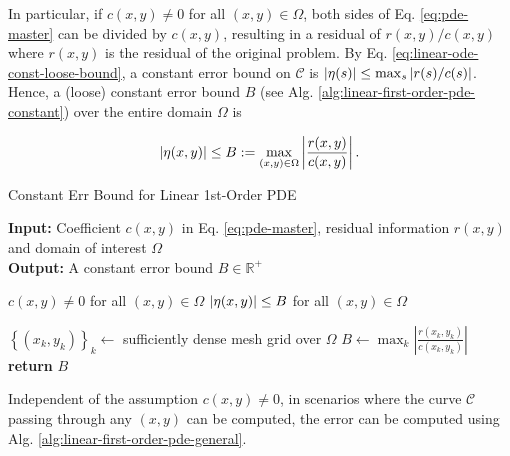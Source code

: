     In particular, if $c(x, y) \neq 0$ for all $(x, y) \in \Omega$, both sides of Eq. \eqref{eq:pde-master} can be divided by $c(x, y)$, resulting in a residual of $r(x, y)/c(x, y)$ where $r(x, y)$ is the residual of the original problem. 
    By Eq. \eqref{eq:linear-ode-const-loose-bound}, a constant error bound on $\mathcal{C}$ is $|\eta(s)| \leq \max_{s}\left|r(s)/c(s)\right|$. 
    Hence, a (loose) constant error bound $B$ (see Alg. \ref{alg:linear-first-order-pde-constant}) over the entire domain $\Omega$ is
    {
        
        \begin{equation}
            |\eta(x, y)| \leq B :=\max_{(x, y)\in \Omega}\left|\frac{r(x, y)}{c(x, y)}\right|.
        \end{equation}
    }

    \makeatletter
    \setlength{\@fptop}{0pt}
    \begin{algorithm}
        \caption{Constant Err Bound for Linear 1st-Order PDE}\label{alg:linear-first-order-pde-constant}
        \textbf{Input:} Coefficient $c(x, y)$ in Eq. \eqref{eq:pde-master}, residual information $r(x, y)$ and domain of interest $\Omega$\\
        \textbf{Output:} A constant error bound $B \in \mathbb{R}^+$
        \begin{algorithmic}
            \Require $c(x, y) \neq 0$ for all $(x, y) \in \Omega$
            \Ensure $|\eta(x, y)| \leq B$ for all $(x, y) \in \Omega$

            \State $\left\{(x_k, y_k)\right\}_{k} \gets$ sufficiently dense mesh grid over $\Omega$
            \State $\displaystyle B \gets \max_{k} \left| \frac{r(x_k, y_k)}{c(x_k, y_k)}\right|$
            \State \textbf{return} $B$
        \end{algorithmic}
    \end{algorithm}
    \makeatother

    Independent of the assumption $c(x, y)\neq 0$, in scenarios where the curve $\mathcal{C}$ passing through any $(x, y)$ can be computed, the error can be computed using Alg. \ref{alg:linear-first-order-pde-general}.


